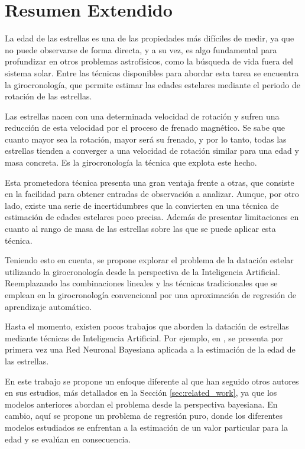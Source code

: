 \chapter{Resumen Extendido}

La edad de las estrellas es una de las propiedades más difíciles de medir, ya que no puede observarse de forma directa, y a su vez, es algo fundamental para profundizar en otros problemas astrofísicos, como la búsqueda de vida fuera del sistema solar. Entre las técnicas disponibles para abordar esta tarea se encuentra la girocronología, que permite estimar las edades estelares mediante el periodo de rotación de las estrellas.

Las estrellas nacen con una determinada velocidad de rotación y sufren una reducción de esta velocidad por el proceso de frenado magnético. Se sabe que cuanto mayor sea la rotación, mayor será su frenado, y por lo tanto, todas las estrellas tienden a converger a una velocidad de rotación similar para una edad y masa concreta. Es la girocronología la técnica que explota este hecho.

Esta prometedora técnica presenta una gran ventaja frente a otras, que consiste en la facilidad para obtener entradas de observación a analizar. Aunque, por otro lado, existe una serie de incertidumbres que la convierten en una técnica de estimación de edades estelares poco precisa. Además de presentar limitaciones en cuanto al rango de masa de las estrellas sobre las que se puede aplicar esta técnica.

\vspace{0.5cm}

Teniendo esto en cuenta, se propone explorar el problema de la datación estelar utilizando la girocronología desde la perspectiva de la Inteligencia Artificial. Reemplazando las combinaciones lineales y las técnicas tradicionales que se emplean en la girocronología convencional por una aproximación de regresión de aprendizaje automático.

Hasta el momento, existen pocos trabajos que aborden la datación de estrellas mediante técnicas de Inteligencia Artificial. Por ejemplo, en \cite{sanders2018}, se presenta por primera vez una Red Neuronal Bayesiana aplicada a la estimación de la edad de las estrellas. 

En este trabajo se propone un enfoque diferente al que han seguido otros autores en sus estudios, más detallados en la Sección \ref{sec:related_work}, ya que los modelos anteriores abordan el problema desde la perspectiva bayesiana. En cambio, aquí se propone un problema de regresión puro, donde los diferentes modelos estudiados se enfrentan a la estimación de un valor particular para la edad y se evalúan en consecuencia.

